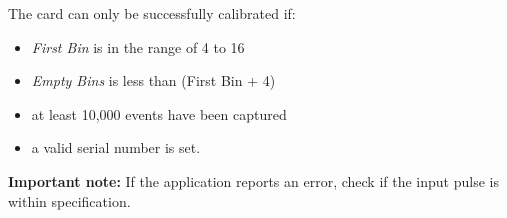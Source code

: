         The card can only be successfully calibrated if:
        
        \begin{itemize}
            \item \textit{First Bin} is in the range of 4 to 16
            \item \textit{Empty Bins} is less than (First Bin + 4)
            \item at least 10,000 events have been captured
            \item a valid serial number is set.
        \end{itemize}
        
        \textbf{Important note:} If the application reports an error, check if the input pulse is within specification.
